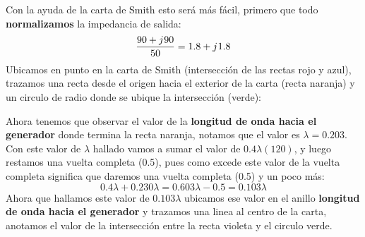 \documentclass[
	12pt, %
	fleqn, %
	a4paper, %
]{LegrandOrangeBook}
\begin{document}
\begin{example}
Con la ayuda de la carta de Smith esto será más fácil, primero que todo \textbf{normalizamos} la impedancia de salida:
\begin{displaymath}
\frac{90+{j\mkern1mu} 90}{50}=1.8+{j\mkern1mu} 1.8
\end{displaymath}
Ubicamos en punto en la carta de Smith (intersección de las rectas rojo y azul), trazamos una recta desde el origen hacia el exterior de la carta (recta naranja) y un circulo de radio donde se ubique la intersección (verde):
\begin{center}
\end{center}
Ahora tenemos que observar el valor de la \textbf{longitud de onda hacia el generador} donde termina la recta naranja, notamos que el valor es $\lambda=0.203$. Con este valor de $\lambda$ hallado vamos a sumar el valor de $0.4\lambda(120)$, y luego restamos una vuelta completa (0.5), pues como excede este valor de la vuelta completa significa que daremos una vuelta completa (0.5) y un poco más:
\begin{displaymath}
0.4\lambda +0.230\lambda =0.603\lambda -0.5=0.103\lambda
\end{displaymath}
Ahora que hallamos este valor de $0.103\lambda$ ubicamos ese valor en el anillo \textbf{longitud de onda hacia el generador} y trazamos una linea al centro de la carta, anotamos el valor de la intersección entre la recta violeta y el circulo verde.
\begin{center}
\end{center}
\end{example}
\end{document}
